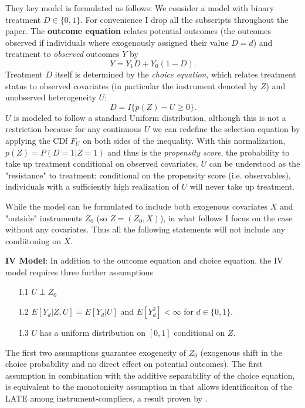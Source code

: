 \documentclass{article}
\begin{document}
They key model is formulated as follows: We consider a model with binary treatment $D\in\{0,1\}$. For convenience I drop all the subscripts throughout the paper.
The \textbf{outcome equation} relates potential outcomes (the outcomes observed if individuals where exogenously assigned their value $D=d$) and treatment to \textit{observed} outcomes $Y$ by
\begin{equation}
    Y = Y_1D + Y_0(1-D).
\end{equation}
Treatment $D$ itself is determined by the \textit{choice equation}, which relates treatment status to observed covariates (in particular the instrument denoted by $Z$) and unobserved heterogeneity $U$:
\begin{equation}
    D = I\{p(Z) - U \geq 0\}.
\end{equation}
$U$ is modeled to follow a standard Uniform distribution, although this is not a restriction because for any continuous $U$ we can redefine the selection equation by applying the CDf $F_U$ on both sides of the inequality.
With this normalization, $p(Z) = P(D=1|Z=1)$ and thus is the \textit{propensity score}, the probability to take up treatment conditional on observed covariates.
$U$ can be understood as the "resistance" to treatment: conditional on the propensity score (i.e. observables), individuals with a sufficiently high realization of $U$ will never take up treatment.  

While the model can be formulated to include both exogenous covariates $X$ and "outside" instruments $Z_0$ (so $Z=(Z_0,X)$), in what follows I focus on the case without any covariates. 
Thus all the following statements will not include any condiitoning on $X$.

\textbf{IV Model}: In addition to the outcome equation and choice equation, the IV model requires three further assumptions
\begin{itemize}
    \item[I.1] $U\perp Z_0$
    \item[I.2] $E[Y_d|Z,U] = E[Y_d|U]$ and $E[Y_d^2]<\infty$ for $d\in\{0,1\}$.
    \item[I.3] $U$ has a uniform distribution on $[0,1]$ conditional on $Z$. 
\end{itemize}
The first two assumptions guarantee exogeneity of $Z_0$ (exogenous shift in the choice probability and no direct effect on potential outcomes).
The first assumption in combination with the additive separability of the choice equation, is equivalent to the monotonicity assumption in \citet{angrist1996identification} that allows identificaiton of the LATE among instrument-compliers, a result proven by \citet{vytlacil2002independence}.
\end{document}
